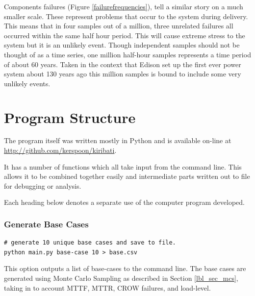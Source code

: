 \documentclass[a4paper,oneside,12pt]{report}
\begin{document}
Components failures (Figure \ref{failurefrequencies}), tell a similar story on a much smaller scale. These represent problems that occur to the system during delivery. This means that in four samples out of a million, three unrelated failures all occurred within the same half hour period. This will cause extreme stress to the system but it is an unlikely event. Though independent samples should not be thought of as a time series, one million half-hour samples represents a time period of about 60 years. Taken in the context that Edison set up the first ever power system about 130 years ago this million samples is bound to include some very unlikely events.
































\section{Program Structure}

The program itself was written mostly in Python and is available on-line at \url{http://github.com/kerspoon/kiribati}.

It has a number of functions which all take input from the command line. This allows it to be combined together easily and intermediate parts written out to file for debugging or analysis.

Each heading below denotes a separate use of the computer program developed. 

\subsubsection{Generate Base Cases}

\begin{verbatim}
# generate 10 unique base cases and save to file.
python main.py base-case 10 > base.csv
\end{verbatim}

This option outputs a list of base-cases to the command line. The base cases are generated using Monte Carlo Sampling as described in Section \ref{lbl_sec_mcs}, taking in to account MTTF, MTTR, CROW failures, and load-level.
\end{document}
